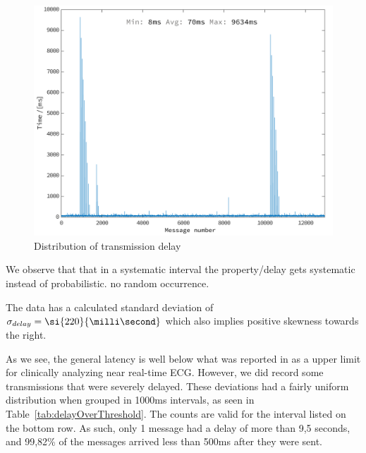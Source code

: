 \begin{figure}[H]
\centering
\includegraphics[scale=0.2]{img/figures/end-to-end2.png}
\caption{Distribution of transmission delay}
\label{fig:qrsAnnotations}
\end{figure}

We observe that that in a systematic interval the property/delay gets 
 systematic instead of probabilistic. no random occurrence.

The data has a calculated standard deviation of $\sigma_{delay} = \si{220}{\milli\second}$ which also implies positive skewness towards the right.


\noindent
As we see, the general latency is well below what was reported in \cite{Alesanco:2010kc} as a upper limit for clinically analyzing near real-time ECG. However, we did record some transmissions that were severely delayed. These deviations had a fairly uniform distribution when grouped in 1000ms intervals, as seen in Table~\ref{tab:delayOverThreshold}. The counts are valid for the interval listed on the bottom row. As such, only 1 message had a delay of more than 9,5 seconds, and 99,82\% of the messages arrived less than 500ms after they were sent. 

